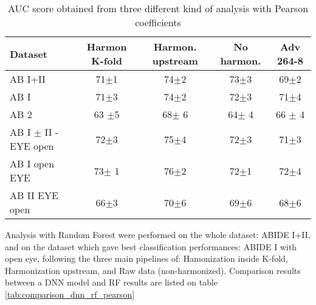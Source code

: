 \documentclass[12pt]{report}
\begin{document}
\begin{table}[!htp]\centering
\scriptsize
\begin{tabular}{lcccc}\toprule
Dataset &Harmon K-fold &Harmon. upstream &No harmon. &Adv 264-8 \\\midrule
AB I+II &71$\pm$1 &74$\pm$2 &73$\pm$3 &69$\pm$2 \\
AB I &71$\pm$3 &74$\pm$2 &72$\pm$3 &71$\pm$4 \\
AB 2 &63 $\pm$5 &68$\pm$ 6 &64$\pm$ 4 &66 $\pm$ 4 \\
AB I $\pm$ II - EYE open &72$\pm$3 &75$\pm$4 &72$\pm$3 &71$\pm$3 \\
AB I open EYE &73$\pm$ 1 &76$\pm$2 &72$\pm$1 &72$\pm$4 \\
AB II EYE open &66$\pm$3 &70$\pm$6 &69$\pm$6 &68$\pm$6 \\
\bottomrule
\end{tabular}
\caption{AUC score obtained from three different kind of analysis with Pearson coefficients}
\label{tab:pearson_results}
\end{table}


Analysis with Random Forest were performed on the whole dataset: ABIDE I+II, and on the dataset which gave best classification performances: ABIDE I with open eye, following the three main pipelines of: Hamonization inside K-fold, Harmonization upstream, and Raw data (non-harmonized).
Comparison results between a DNN model and RF results are listed on table \ref{tab:comparison_dnn_rf_pearson}
\end{document}

